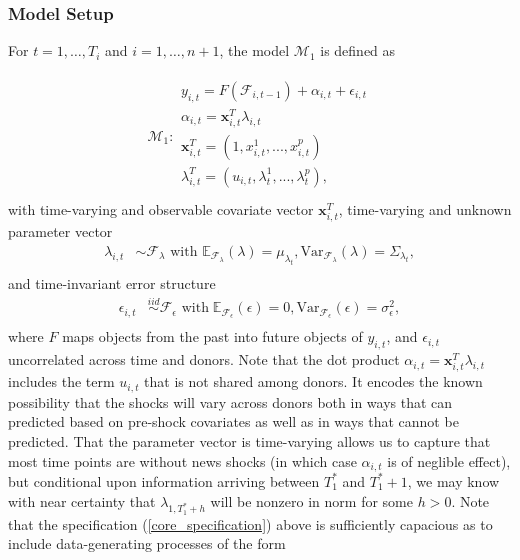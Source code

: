 \documentclass[9pt]{beamer}
\newcommand{\x}{\textbf{x}}
\newcommand{\simiid}{\stackrel{iid}{\sim}} %
\newcommand{\indep}{\perp \!\!\! \perp } %
\def\mrm#1{\mathrm{#1}} %
\def\mc#1{\mathcal{#1}} %
\def\E{\mathbb{E}} %
\def\mc#1{\mathcal{#1}}
\theoremstyle{definition}
\begin{document}
    \begin{frame}
    \frametitle{Model Setup}
    
    \fontsize{8}{7.2}
    
    For $t= 1, \ldots, T_i$ and $i = 1, \ldots, n+1$, the model $\mc{M}_1$ is defined as 

  \begin{align}
    \mc{M}_1 \colon \begin{array}{l}
      y_{i,t} = F(\mathcal{F}_{i,t-1}) + \alpha_{i,t} + \epsilon_{i,t}\\[.2cm]\label{core_specification}
      \alpha_{i,t} = \x^{T}_{i,t}\lambda_{i,t} \\[.2cm]
     \x_{i,t}^{T} = (1,x^{1}_{i,t},...,x^{p}_{i,t})\\[.2cm] 
     \lambda_{i,t}^{T} = (u_{i,t},\lambda^{1}_{t},...,\lambda^{p}_{t}),\\[.2cm]
    \end{array}
    \end{align}
with time-varying and observable covariate vector $\x_{i,t}^{T}$, time-varying and unknown parameter vector
\begin{align*}
\lambda_{i,t} &\sim \mc{F}_{\lambda}\text{ with }  \E_{\mathcal{F}_{\lambda}}(\lambda) = \mu_{\lambda_{t}}, \mrm{Var}_{\mc{F}_{\lambda}}(\lambda) = \Sigma_{\lambda_{t}},\\
\end{align*}
and time-invariant error structure
  \begin{align*}
    \epsilon_{i,t} &\simiid \mc{F}_{\epsilon} \text{ with}  \; \E_{\mc{F}_{\epsilon}}(\epsilon) = 0, \mrm{Var}_{\mc{F}_{\epsilon}}(\epsilon)  = \sigma^{2}_{\epsilon},  \\
    \end{align*}
where $F$ maps objects from the past into future objects of $y_{i,t}$, and $\epsilon_{i,t}$ uncorrelated across time and donors.  Note that the dot product $\alpha_{i,t} = \x^{T}_{i,t}\lambda_{i,t}$ includes the term $u_{i,t}$ that is not shared among donors.  It encodes the known possibility that the shocks will vary across donors both in ways that can predicted based on pre-shock covariates as well as in ways that cannot be predicted.  That the parameter vector is time-varying allows us to capture that most time points are without news shocks (in which case $\alpha_{i,t}$ is of neglible effect), but conditional upon information arriving between $T_{1}^{*}$ and $T_{1}^{*}+1$, we may know with near certainty that $\lambda_{1,T_{1}^{*}+h}$ will be nonzero in norm for some $h>0$.  Note that the specification (\ref{core_specification}) above is sufficiently capacious as to include data-generating processes of the form 
    

    \end{frame}
    
\end{document}
